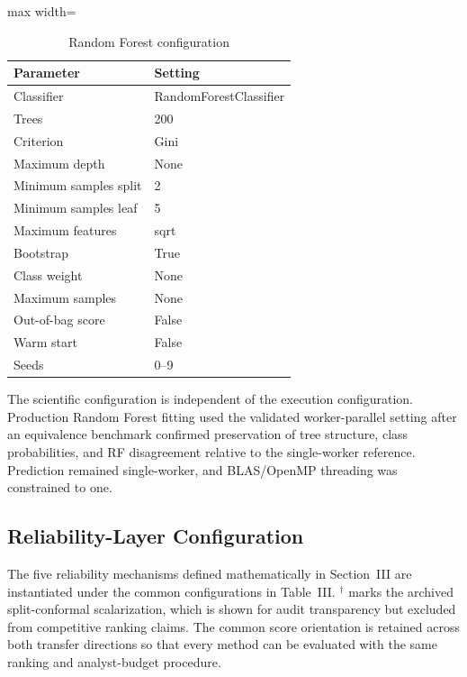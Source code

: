 \documentclass[conference]{IEEEtran}
\begin{document}
\begin{table}[t]
\centering
\caption{Random Forest configuration}
\begin{adjustbox}{max width=\columnwidth}
\begin{tabular}{ll}
\toprule
\textbf{Parameter} & \textbf{Setting} \\
\midrule
Classifier & RandomForestClassifier \\
Trees & 200 \\
Criterion & Gini \\
Maximum depth & None \\
Minimum samples split & 2 \\
Minimum samples leaf & 5 \\
Maximum features & sqrt \\
Bootstrap & True \\
Class weight & None \\
Maximum samples & None \\
Out-of-bag score & False \\
Warm start & False \\
Seeds & 0--9 \\
\bottomrule
\end{tabular}
\end{adjustbox}
\end{table}

The scientific configuration is independent of the execution configuration. Production Random Forest fitting used the validated worker-parallel setting after an equivalence benchmark confirmed preservation of tree structure, class probabilities, and RF disagreement relative to the single-worker reference. Prediction remained single-worker, and BLAS/OpenMP threading was constrained to one.

\subsection{Reliability-Layer Configuration}

The five reliability mechanisms defined mathematically in Section~III are instantiated under the common configurations in Table~III. $^\dagger$ marks the archived split-conformal scalarization, which is shown for audit transparency but excluded from competitive ranking claims. The common score orientation is retained across both transfer directions so that every method can be evaluated with the same ranking and analyst-budget procedure.
\end{document}
